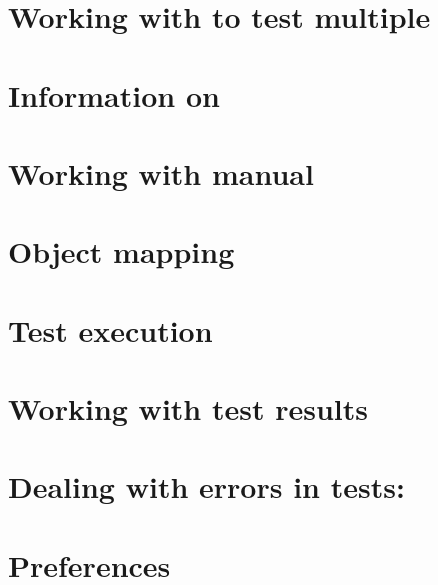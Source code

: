 \section{Working with \gdjobs{} to test multiple \gdauts{}}
\label{WorkingWithJobs}


\clearpage 

\section{Information on \gdsteps{}}


\section{Working with manual \gdcases{}}


\clearpage

\section{Object mapping}


\clearpage

\section{Test execution}


\clearpage

\section{Working with test results}


\clearpage

\section{Dealing with errors in tests: \gdehandlers{}}
\label{customizedehandler}


\clearpage
\section{Preferences}
\label{ConfigurePrefs}


